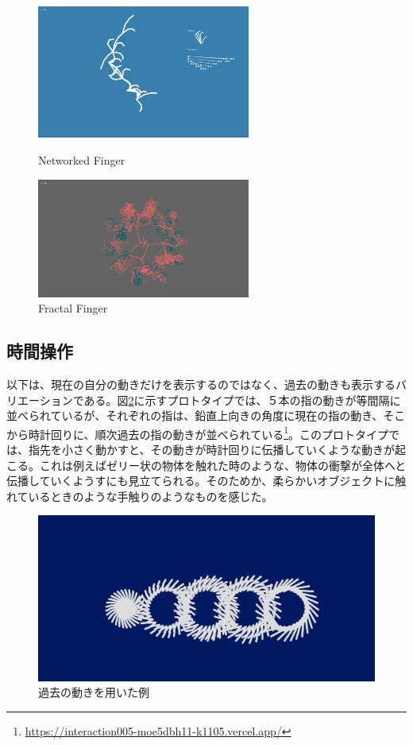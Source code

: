 \begin{figure}[htbp]
  \begin{minipage}[b]{0.5\linewidth}
    \centering
    \includegraphics[keepaspectratio, width=7cm]{img/networked_finger.png}
    \caption{Networked Finger}
    \label{fig:networked_finger}
  \end{minipage}
  \begin{minipage}[b]{0.5\linewidth}
    \centering
    \includegraphics[keepaspectratio, width=7cm]{img/fractel_finger.png}
    \caption{Fractal Finger}
    \label{fig:fractal_finger}
  \end{minipage}
\end{figure}

\subsection{時間操作}
以下は、現在の自分の動きだけを表示するのではなく、過去の動きも表示するバリエーションである。図\ref{fig:prototype_delay}に示すプロトタイプでは、５本の指の動きが等間隔に並べられているが、それぞれの指は、鉛直上向きの角度に現在の指の動き、そこから時計回りに、順次過去の指の動きが並べられている\footnote{\url{https://interaction005-moe5dbh11-k1105.vercel.app/}}。このプロトタイプでは、指先を小さく動かすと、その動きが時計回りに伝播していくような動きが起こる。これは例えばゼリー状の物体を触れた時のような、物体の衝撃が全体へと伝播していくようすにも見立てられる。そのためか、柔らかいオブジェクトに触れているときのような手触りのようなものを感じた。

\begin{figure}[H]
  \centering
  \includegraphics[width=15cm]{img/past_time.png}
  \caption{過去の動きを用いた例}
  \label{fig:prototype_delay}
\end{figure}

